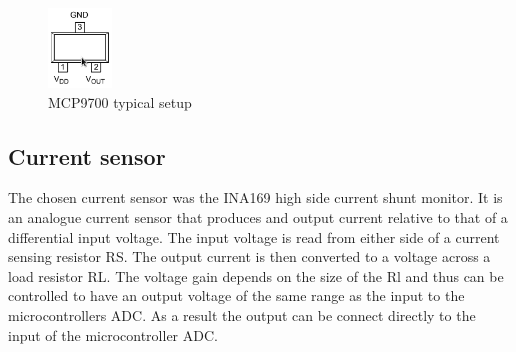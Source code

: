 \begin{figure}[H]
  \centering
    \includegraphics[width=0.15\textwidth]{MCP9700_setup.png}
    \caption{MCP9700 typical setup}
    \label{fig:model}
\end{figure}


\newpage
\subsection{Current sensor}
The chosen current sensor was the INA169 high side current shunt monitor. It is an analogue current sensor that produces and output current relative to that of a differential input voltage. The input voltage is read from either side of a current sensing resistor RS. The output current is then converted to a voltage across a load resistor RL. The voltage gain depends on the size of the Rl and thus can be controlled to have an output voltage of the same range as the input to the microcontrollers ADC. As a result the output can be connect directly to the input of the microcontroller ADC.

